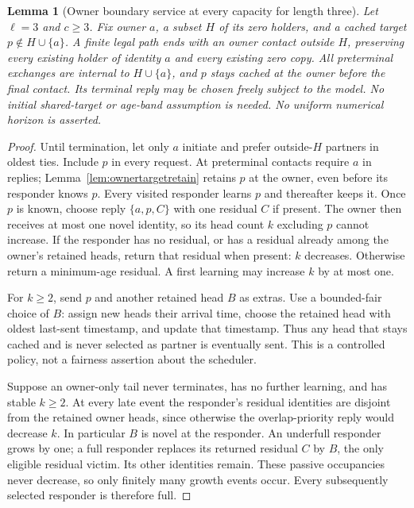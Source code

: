\documentclass[11pt]{article}
\newtheorem{lemma}[theorem]{Lemma}
\begin{document}
\begin{lemma}[Owner boundary service at every capacity for length three]
\label{lem:threegeneralcallback}
Let $\ell=3$ and $c\ge3$. Fix owner $a$, a subset $H$ of
its zero holders, and a cached target $p\notin H\cup\{a\}$.
A finite legal path ends with an owner contact outside $H$,
preserving every existing holder of identity $a$ and every
existing zero copy. All preterminal exchanges are internal to
$H\cup\{a\}$, and $p$ stays cached at the owner before the
final contact. Its terminal reply may be chosen freely subject
to the model. No initial shared-target or age-band assumption
is needed. No uniform numerical horizon is asserted.
\end{lemma}
\begin{proof}
Until termination, let only $a$ initiate and prefer outside-$H$
partners in oldest ties. Include $p$ in every request. At
preterminal contacts require $a$ in replies; Lemma~\ref{lem:ownertargetretain} retains $p$
at the owner, even before its responder knows $p$. Every
visited responder learns $p$ and thereafter keeps it. Once
$p$ is known, choose reply $\{a,p,C\}$ with one residual $C$
if present. The owner then receives at most one novel identity,
so its head count $k$ excluding $p$ cannot increase.
If the responder has no residual, or has a residual already
among the owner's retained heads, return that residual when
present: $k$ decreases. Otherwise return a minimum-age residual.
A first learning may increase $k$ by at most one.

For $k\ge2$, send $p$ and another retained head $B$ as extras.
Use a bounded-fair choice of $B$: assign new heads their arrival
time, choose the retained head with oldest last-sent timestamp,
and update that timestamp. Thus any head that stays cached and
is never selected as partner is eventually sent. This is a
controlled policy, not a fairness assertion about the scheduler.

Suppose an owner-only tail never terminates, has no further
learning, and has stable $k\ge2$. At every late event the
responder's residual identities are disjoint from the retained
owner heads, since otherwise the overlap-priority reply would
decrease $k$. In particular $B$ is novel at the responder.
An underfull responder grows by one; a full responder replaces
its returned residual $C$ by $B$, the only eligible residual
victim. Its other identities remain. These passive occupancies
never decrease, so only finitely many growth events occur.
Every subsequently selected responder is therefore full.


\end{proof}
\end{document}
